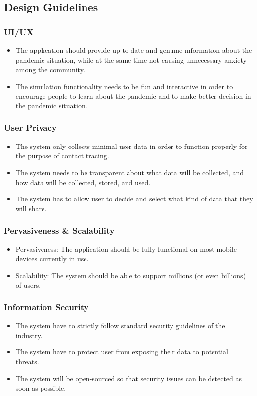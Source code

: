   \subsection{Design Guidelines}
    \subsubsection{UI/UX}
      \begin{itemize}
        \item The application should provide up-to-date and genuine information about the pandemic situation, while at the same time not causing unnecessary anxiety among the community.
        \item The simulation functionality needs to be fun and interactive in order to encourage people to learn about the pandemic and to make better decision in the pandemic situation.
      \end{itemize}

    \subsubsection{User Privacy}
      \begin{itemize}
        \item The system only collects minimal user data in order to function properly for the purpose of contact tracing.
        \item The system needs to be transparent about what data will be collected, and how data will be collected, stored, and used.
        \item The system has to allow user to decide and select what kind of data that they will share.
      \end{itemize}
    
    \subsubsection{Pervasiveness \& Scalability}
      \begin{itemize}
        \item Pervasiveness: The application should be fully functional on most mobile devices currently in use.
        \item Scalability: The system should be able to support millions (or even billions) of users.
      \end{itemize}
    
    \subsubsection{Information Security}
      \begin{itemize}
        \item The system have to strictly follow standard security guidelines of the industry.
        \item The system have to protect user from exposing their data to potential threats.
        \item The system will be open-sourced so that security issues can be detected as soon as possible.
      \end{itemize}

